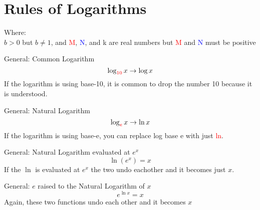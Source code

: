 

\section{Rules of Logarithms}
\noindent Where:\\
$b > 0$ but $b \neq 1$, and \textcolor{red}M, \textcolor{blue}N, and k are real 
numbers but \textcolor{red}M and \textcolor{blue}N must be positive

\begin{framed}
  \noindent General: Common Logarithm
  \begin{equation*}
    \log_{\textcolor{red}{10}} x \rightarrow \log x
  \end{equation*}
  \noindent If the logarithm is using base-10, it is common to drop the number 
  10 because it is understood.
\end{framed}

\begin{framed}
  \noindent General: Natural Logarithm
  \begin{equation*}
    \log_{\textcolor{red}{e}} x \rightarrow \ln x
  \end{equation*}
  \noindent If the logarithm is using base-e, you can replace log base e with 
  just \textcolor{red}{ln}.
\end{framed}

\begin{framed}
  \noindent General: Natural Logarithm evaluated at $e^x$
  \begin{equation*}
    \ln (e^x) = x
  \end{equation*}
  \noindent If the $\ln$ is evaluated at $e^x$ the two undo eachother and it
    becomes just $x$.
\end{framed}

\begin{framed}
  \noindent General: $e$ raised to the Natural Logarithm of $x$
  \begin{equation*}
    e^{\ln x} = x
  \end{equation*}
  \noindent Again, these two functions undo each other and it becomes $x$
\end{framed}

